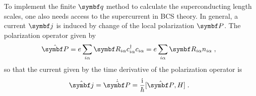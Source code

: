 \documentclass[../notes.tex]{subfiles}
\begin{document}
To implement the finite \(\vb{q}\) method to calculate the superconducting length scales, one also needs access to the supercurrent in BCS theory.
In general, a current \(\vb{j}\) is induced by change of the local polarization \(\vb{P}\).
The polarization operator given by
\begin{equation}
	\ope{\vb{P}} = e \sum_{i \alpha} \vb{R}_{i \alpha} c_{i \alpha}^{\dagger} c_{i \alpha} = e \sum_{i \alpha} \vb{R}_{i \alpha} n_{i \alpha} \;,
\end{equation}
so that the current given by the time derivative of the polarization operator is
\begin{equation}
	\ope{\vb{j}} = \dot{\ope{\vb{P}}} = \frac{\iu}{\hbar} [\ope{\vb{P}}, H]
	\label{eq:current operator as time der of polarization} \;.
\end{equation}
\end{document}
